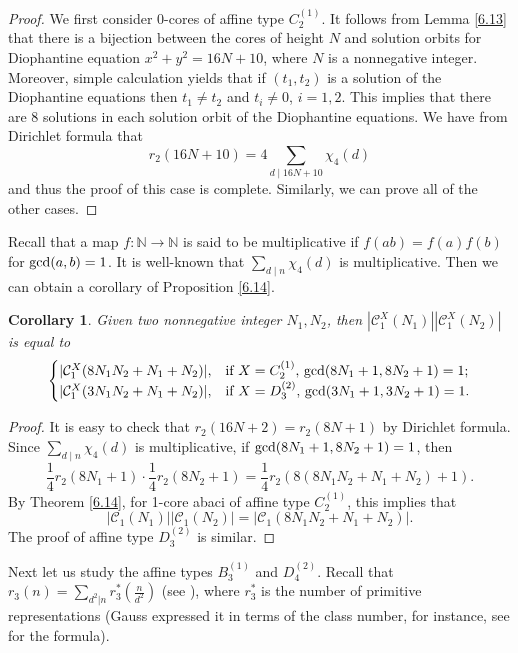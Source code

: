 \documentclass[11pt]{amsart}
\theoremstyle{plain}
\numberwithin{equation}{subsection}
\newtheorem{corollary}[theorem]{Corollary}
\begin{document}
\begin{proof}
We first consider 0-cores of affine type $C_2^{(1)}$. It follows from Lemma \ref{6.13} that 
there is a bijection between the cores of height $N$ and solution orbits
for Diophantine equation $x^2+y^2=16N+10$, where $N$ is a nonnegative integer. Moreover, 
simple calculation yields that if $(t_1, t_2)$ is a solution of the Diophantine equations then $t_1\neq t_2$ and $t_i\neq 0$, $i=1,2$.
This implies that there are 8 solutions in each solution orbit of the Diophantine equations. 
We have from Dirichlet formula that $$r_2(16N+10)=4\sum\limits_{d\mid 16N+10}\chi_4(d)$$ and thus the proof of this case is complete.
Similarly, we can prove all of the other cases.
\end{proof}

Recall that a map $f: \mathbb{N}\longrightarrow \mathbb{N}$ 
is said to be multiplicative if $f(ab)=f(a)f(b)$ for ${\rm gcd}(a, b)=1$.
It is well-known that $\sum\limits_{d\mid n}\chi_4(d)$ is multiplicative. 
Then we can obtain a corollary of Proposition \ref{6.14}.

\begin{corollary}
Given two nonnegative integer $N_1, N_2$, then $|\mathcal{C}_1^{X}(N_1)||\mathcal{C}_1^{X}(N_2)|$ is equal to
$$
\begin{cases}
  |\mathcal{C}_1^{X}(8N_1N_2+N_1+N_2)|, & \mbox{\rm if } X=C_2^{(1)},\,  {\rm gcd}(8N_1+1, 8N_2+1)=1;\\
  |\mathcal{C}_1^{X}(3N_1N_2+N_1+N_2)|, & \mbox{\rm if } X=D_3^{(2)},\,  {\rm gcd}(3N_1+1, 3N_2+1)=1.
\end{cases}
$$
\end{corollary}

\begin{proof}
It is easy to check that $r_2(16N+2)=r_2(8N+1)$ by Dirichlet formula.
Since $\sum\limits_{d\mid n}\chi_4(d)$ is multiplicative, if ${\rm gcd}(8N_1+1, 8N_2+1)=1$, then
$$\frac{1}{4}r_2(8N_1+1)\cdot\frac{1}{4}r_2(8N_2+1)=\frac{1}{4}r_2(8(8N_1N_2+N_1+N_2)+1).$$
By Theorem \ref{6.14}, for 1-core abaci of affine type $C_2^{(1)}$, this implies that
$$|\mathcal{C}_1(N_1)||\mathcal{C}_1(N_2)|=|\mathcal{C}_1(8N_1N_2+N_1+N_2)|.$$
The proof of affine type $D_3^{(2)}$ is similar.
\end{proof}

Next let us study the affine types $B_3^{(1)}$ and $D_4^{(2)}$. 
Recall that $r_3(n)=\sum_{d^2|n}r_3^*(\frac{n}{d^2})$ (see \cite[Equation (4.8)]{G}), 
where $r_3^*$ is the number of primitive representations (Gauss expressed it in terms of the class number, 
for instance, see \cite[Equation (11.29)]{I} for the formula).
\end{document}
